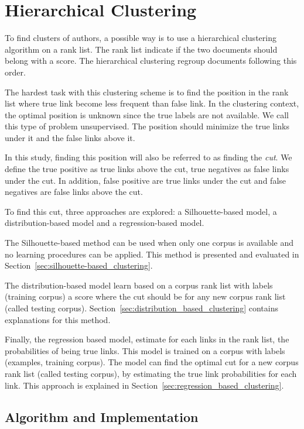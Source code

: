 \section{Hierarchical Clustering \label{sec:authorship_clustering_methods}}

To find clusters of authors, a possible way is to use a hierarchical clustering algorithm on a rank list.
The rank list indicate if the two documents should belong with a score.
The hierarchical clustering regroup documents following this order.

The hardest task with this clustering scheme is to find the position in the rank list where true link become less frequent than false link.
In the clustering context, the optimal position is unknown since the true labels are not available.
We call this type of problem unsupervised.
The position should minimize the true links under it and the false links above it.

In this study, finding this position will also be referred to as finding the \textit{cut}.
We define the true positive as true links above the cut, true negatives as false links under the cut.
In addition, false positive are true links under the cut and false negatives are false links above the cut.

To find this cut, three approaches are explored: a Silhouette-based model, a distribution-based model and a regression-based model.

The Silhouette-based method can be used when only one corpus is available and no learning procedures can be applied.
This method is presented and evaluated in Section~\ref{sec:silhouette-based_clustering}.

The distribution-based model learn based on a corpus rank list with labels (training corpus) a score where the cut should be for any new corpus rank list (called testing corpus).
Section~\ref{sec:distribution_based_clustering} contains explanations for this method.

Finally, the regression based model, estimate for each links in the rank list, the probabilities of being true links.
This model is trained on a corpus with labels (examples, training corpus).
The model can find the optimal cut for a new corpus rank list (called testing corpus), by estimating the true link probabilities for each link.
This approach is explained in Section~\ref{sec:regression_based_clustering}.

\subsection{Algorithm and Implementation \label{sec:algorithm_and_implementation}}

